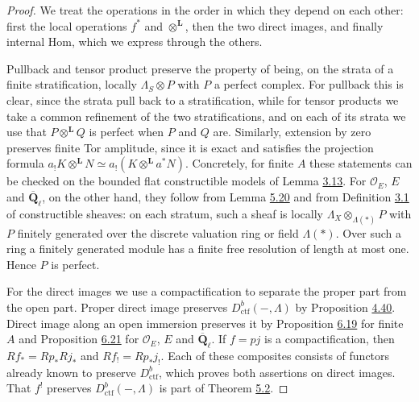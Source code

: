 \documentclass[11pt]{article}
\begin{document}
\begin{proof}[{Proof}]\label{bp606}%
We treat the operations in the order in which they depend on each other: first the local operations \(f^*\) and \(\otimes^{\mathbf L}\), then the two direct images, and finally internal Hom, which we express through the others.

Pullback and tensor product preserve the property of being, on the strata of a finite stratification, locally \(\Lambda_S\otimes P\) with \(P\) a perfect complex. For pullback this is clear, since the strata pull back to a stratification, while for tensor products we take a common refinement of the two stratifications, and on each of its strata we use that \(P\otimes^{\mathbf L}Q\) is perfect when \(P\) and \(Q\) are. Similarly, extension by zero preserves finite Tor amplitude, since it is exact and satisfies the projection formula \(a_!K\otimes^{\mathbf L}N\simeq a_!(K\otimes^{\mathbf L}a^*N)\). Concretely, for finite \(A\) these statements can be checked on the bounded flat constructible models of Lemma \hyperref[bp235]{3.13}. For \(\mathcal O_E\), \(E\) and \(\overline{\mathbf Q}_\ell\), on the other hand, they follow from Lemma \hyperref[bp474]{5.20} and from Definition \hyperref[bp199]{3.1} of constructible sheaves: on each stratum, such a sheaf is locally \(\Lambda_X\otimes_{\Lambda(*)}P\) with \(P\) finitely generated over the discrete valuation ring or field \(\Lambda(*)\). Over such a ring a finitely generated module has a finite free resolution of length at most one. Hence \(P\) is perfect.

For the direct images we use a compactification to separate the proper part from the open part. Proper direct image preserves \(D^b_{\mathrm{ctf}}(-,\Lambda)\) by Proposition \hyperref[bp405]{4.40}. Direct image along an open immersion preserves it by Proposition \hyperref[bp570]{6.19} for finite \(A\) and Proposition \hyperref[bp577]{6.21} for \(\mathcal O_E\), \(E\) and \(\overline{\mathbf Q}_\ell\). If \(f=pj\) is a compactification, then \(Rf_*=Rp_*Rj_*\) and \(Rf_!=Rp_*j_!\). Each of these composites consists of functors already known to preserve \(D^b_{\mathrm{ctf}}\), which proves both assertions on direct images. That \(f^!\) preserves \(D^b_{\mathrm{ctf}}(-,\Lambda)\) is part of Theorem \hyperref[bp413]{5.2}.


\end{proof}
\end{document}
